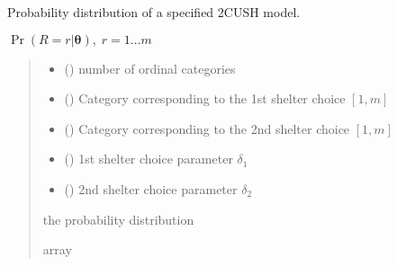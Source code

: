 \documentclass[letterpaper,10pt,english]{sphinxmanual}
\begin{document}
\begin{fulllineitems}
\label{\detokenize{cubmods:cubmods.cush2.pmf}}
\pysigstartsignatures
{}
\pysigstopsignatures
\sphinxAtStartPar
Probability distribution of a specified 2\sphinxhyphen{}CUSH model.

\sphinxAtStartPar
\(\Pr(R = r | \pmb\theta),\; r=1 \ldots m\)
\begin{quote}\begin{description}
\begin{itemize}
\item {} 
\sphinxAtStartPar
{} () \textendash{} number of ordinal categories

\item {} 
\sphinxAtStartPar
{} () \textendash{} Category corresponding to the 1st shelter choice \([1,m]\)

\item {} 
\sphinxAtStartPar
{} () \textendash{} Category corresponding to the 2nd shelter choice \([1,m]\)

\item {} 
\sphinxAtStartPar
{} () \textendash{} 1st shelter choice parameter \(\delta_1\)

\item {} 
\sphinxAtStartPar
{} () \textendash{} 2nd shelter choice parameter \(\delta_2\)

\end{itemize}

\sphinxAtStartPar
the probability distribution

\sphinxAtStartPar
array

\end{description}\end{quote}

\end{fulllineitems}
\end{document}
